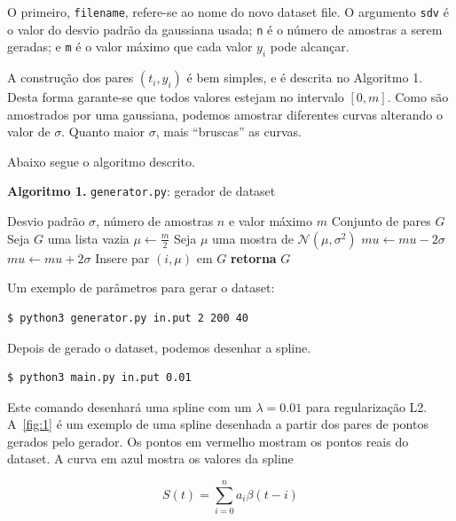 \documentclass[12pt]{article}
\theoremstyle{plain}
\numberwithin{equation}{section}
\newcommand{\code}[1]{\lstinline[mathescape=true]{#1}}
\begin{document}
O primeiro, \code{filename}, refere-se ao nome do novo dataset file. O argumento \code{sdv} é o
valor do desvio padrão da gaussiana usada; \code{n} é o número de amostras a serem geradas; e
\code{m} é o valor máximo que cada valor $y_i$ pode alcançar.

A construção dos pares $(t_i,y_i)$ é bem simples, e é descrita no Algoritmo 1. Desta forma
garante-se que todos valores estejam no intervalo $[0, m]$. Como são amostrados por uma gaussiana,
podemos amostrar diferentes curvas alterando o valor de $\sigma$. Quanto maior $\sigma$, mais
``bruscas'' as curvas.

Abaixo segue o algoritmo descrito.

\begin{algorithm}[h]
  \caption*{\textbf{Algoritmo 1.} \code{generator.py}: gerador de dataset}
  \begin{algorithmic}[1]
    \Require Desvio padrão $\sigma$, número de amostras $n$ e valor máximo $m$
    \Ensure Conjunto de pares $G$
    \State Seja $G$ uma lista vazia
    \State $\mu\gets \frac{m}{2}$
    \For{inteiro $i$ no intervalo $[0,n)$}
      \State Seja $\mu$ uma mostra de $\mathcal{N}(\mu,\sigma^2)$
        \State $mu\gets mu - 2\sigma$
        \State $mu\gets mu + 2\sigma$
      \EndIf
      \State Insere par $(i, \mu)$ em $G$
    \EndFor%
    \State\textbf{retorna} $G$
  \end{algorithmic}
\end{algorithm}

Um exemplo de parâmetros para gerar o dataset:

\begin{lstlisting}[numbers=none]
$ python3 generator.py in.put 2 200 40
\end{lstlisting}

Depois de gerado o dataset, podemos desenhar a spline.

\begin{lstlisting}[numbers=none]
$ python3 main.py in.put 0.01
\end{lstlisting}

Este comando desenhará uma spline com um $\lambda=0.01$ para regularização L2. A~\autoref{fig:1} é
um exemplo de uma spline desenhada a partir dos pares de pontos gerados pelo gerador. Os pontos em
vermelho mostram os pontos reais do dataset. A curva em azul mostra os valores da spline

\begin{equation*}
  S(t)=\sum_{i=0}^n a_i\beta(t-i)
\end{equation*}
\end{document}
